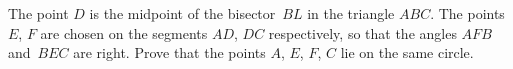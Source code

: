 \problem
The point $D$ is the midpoint of the bisector~$BL$ in the triangle $ABC$.
The points $E$, $F$ are chosen on the segments $AD$, $DC$ respectively, so that
the angles $AFB$ and~$BEC$ are right.
Prove that the points $A$, $E$, $F$, $C$ lie on the same circle.
\solution
\endproblem
